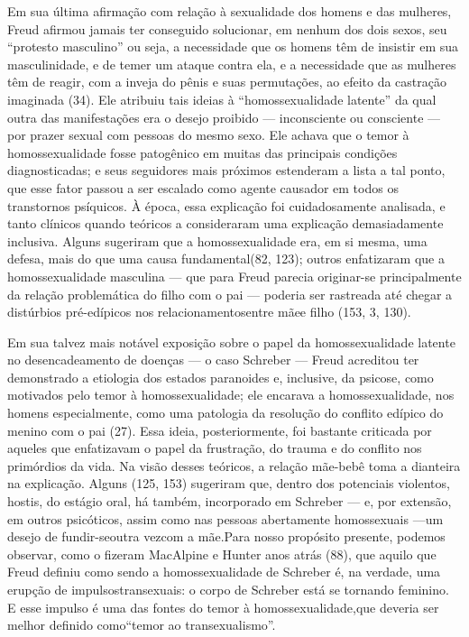 Em sua última afirmação com relação à sexualidade\idxsexuateo{} dos homens e das
mulheres, Freud\idxfreudsexua{} afirmou jamais ter conseguido solucionar, em nenhum dos
dois sexos, seu ``protesto masculino''\idxmascupro{} ou
seja, a necessidade que os homens têm de insistir em sua masculinidade,
e de temer um ataque contra ela, e a necessidade que as mulheres têm de
reagir, com a inveja\idxinvej{} do pênis e suas permutações, ao efeito da
castração imaginada (34). Ele atribuiu tais ideias à
``homossexualidade latente'' da qual outra
das manifestações era o desejo proibido --- inconsciente ou consciente
--- por prazer sexual com pessoas do mesmo sexo. Ele achava que o
temor à homossexualidade fosse patogênico em muitas das principais
condições diagnosticadas; e seus seguidores mais próximos estenderam a
lista a tal ponto, que esse fator passou a ser escalado como agente
causador em todos os transtornos psíquicos. À época, essa explicação
foi cuidadosamente analisada, e tanto clínicos quando teóricos a
consideraram uma explicação demasiadamente inclusiva. Alguns sugeriram
que a homossexualidade era, em si mesma, uma defesa, mais do que uma
causa fundamental\idxmaeshoms[|(] (82, 123); outros enfatizaram que a homossexualidade
masculina --- que para Freud parecia originar-se principalmente da
relação problemática do filho com o pai --- poderia ser rastreada até
chegar a distúrbios pré-edípicos nos relacionamentos\idxhomosexpe[|(] entre mãe\idxmaeshomo[|(] e filho
(153, 3, 130).

Em sua talvez mais notável exposição sobre o papel da
homossexualidade latente no desencadeamento de doenças --- o caso
Schreber\idxschreb{} --- Freud acreditou ter demonstrado a etiologia dos estados
paranoides e,\idxparan{} inclusive, da psicose, como motivados pelo temor à
homossexualidade; ele encarava a homossexualidade, nos homens
especialmente, como uma patologia da resolução do conflito edípico do
menino com o pai (27). Essa ideia, posteriormente, foi bastante
criticada por aqueles que enfatizavam o papel da frustração, do trauma
e do conflito nos primórdios da vida. Na visão desses teóricos, a
relação mãe-bebê toma a dianteira na explicação. Alguns (125, 153)
sugeriram que, dentro dos potenciais violentos, hostis, do estágio
oral,\idxforal{} há também, incorporado em Schreber --- e, por extensão, em
outros psicóticos, assim como nas pessoas abertamente homossexuais ---\idxtranseetio[|(]
um desejo de fundir-se\idxtransesimb[|(] outra vez\idxmaestran[|(] com a mãe.\idxmascupap[|(] Para nosso propósito
presente, podemos observar, como o fizeram MacAlpine\idxmacal{} e Hunter\idxhunt{} anos
atrás (88), que aquilo que Freud definiu como sendo a homossexualidade
de Schreber é, na verdade, uma erupção de impulsos\idxtranse[|(] transexuais:\idxmaestran{} o corpo
de Schreber está se tornando feminino. E esse impulso é uma das fontes
do temor à homossexualidade,\idxmaeshoms[|)] que deveria ser melhor definido como\idxmaeshomo[|)]
``temor ao transexualismo''.

